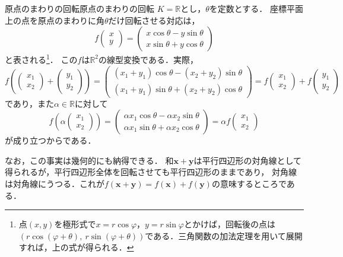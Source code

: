 \begin{example}{原点のまわりの回転}{原点のまわりの回転}
  $K = \mathbb{R}$とし，$\theta$を定数とする．
  座標平面上の点を原点のまわりに角$\theta$だけ回転させる対応は，
  \[
    f\begin{pmatrix} x \\ y \end{pmatrix}
    = \begin{pmatrix} x\cos\theta - y\sin\theta \\ x\sin\theta + y\cos\theta \end{pmatrix}
  \]
  と表される\footnote{点$(x, y)$を極形式で$x = r\cos\varphi$，$y = r\sin\varphi$とかけば，回転後の点は$(r\cos(\varphi + \theta),\ r\sin(\varphi + \theta))$である．三角関数の加法定理を用いて展開すれば，上の式が得られる．}．
  この$f$は$\mathbb{R}^2$の線型変換である．実際，
  \[
    f\left( \begin{pmatrix} x_1 \\ x_2 \end{pmatrix} + \begin{pmatrix} y_1 \\ y_2 \end{pmatrix} \right)
    = \begin{pmatrix} (x_1 + y_1)\cos\theta - (x_2 + y_2)\sin\theta \\ (x_1 + y_1)\sin\theta + (x_2 + y_2)\cos\theta \end{pmatrix}
    = f\begin{pmatrix} x_1 \\ x_2 \end{pmatrix} + f\begin{pmatrix} y_1 \\ y_2 \end{pmatrix}
  \]
  であり，また$\alpha \in \mathbb{R}$に対して
  \[
    f\left( \alpha \begin{pmatrix} x_1 \\ x_2 \end{pmatrix} \right)
    = \begin{pmatrix} \alpha x_1 \cos\theta - \alpha x_2 \sin\theta \\ \alpha x_1 \sin\theta + \alpha x_2 \cos\theta \end{pmatrix}
    = \alpha f\begin{pmatrix} x_1 \\ x_2 \end{pmatrix}
  \]
  が成り立つからである．

  なお，この事実は幾何的にも納得できる．
  和$\bm{x} + \bm{y}$は平行四辺形の対角線として得られるが，平行四辺形全体を回転させても平行四辺形のままであり，
  対角線は対角線にうつる．これが$f(\bm{x} + \bm{y}) = f(\bm{x}) + f(\bm{y})$の意味するところである．
\end{example}

